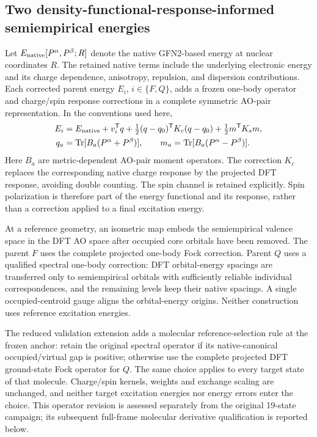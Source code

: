 \documentclass[11pt,a4paper]{article}
\begin{document}
\subsection{Two density-functional-response-informed semiempirical energies}
Let $E_{\rm native}[P^\alpha,P^\beta;R]$ denote the native GFN2-based energy at nuclear coordinates $R$. The retained native terms include the underlying electronic energy and its charge dependence, anisotropy, repulsion, and dispersion contributions. Each corrected parent energy $E_i$, $i\in\{F,Q\}$, adds a frozen one-body operator and charge/spin response corrections in a complete symmetric AO-pair representation. In the conventions used here,
\begin{align}
 E_i &= E_{\rm native}+v_i^{\mathsf T}q
 +\tfrac12(q-q_0)^{\mathsf T}K_c(q-q_0)
 +\tfrac12m^{\mathsf T}K_s m,\label{eq:parent}\\
 q_a&=\operatorname{Tr}[B_a(P^\alpha+P^\beta)],\qquad
 m_a=\operatorname{Tr}[B_a(P^\alpha-P^\beta)].
\end{align}
Here $B_a$ are metric-dependent AO-pair moment operators. The correction $K_c$ replaces the corresponding native charge response by the projected DFT response, avoiding double counting. The spin channel is retained explicitly. Spin polarization is therefore part of the energy functional and its response, rather than a correction applied to a final excitation energy.

At a reference geometry, an isometric map embeds the semiempirical valence space in the DFT AO space after occupied core orbitals have been removed. The parent $F$ uses the complete projected one-body Fock correction. Parent $Q$ uses a qualified spectral one-body correction: DFT orbital-energy spacings are transferred only to semiempirical orbitals with sufficiently reliable individual correspondences, and the remaining levels keep their native spacings. A single occupied-centroid gauge aligns the orbital-energy origins. Neither construction uses reference excitation energies.

The reduced validation extension adds a molecular reference-selection rule at the frozen anchor: retain the original spectral operator if its native-canonical occupied/virtual gap is positive; otherwise use the complete projected DFT ground-state Fock operator for $Q$. The same choice applies to every target state of that molecule. Charge/spin kernels, weights and exchange scaling are unchanged, and neither target excitation energies nor energy errors enter the choice. This operator revision is assessed separately from the original 19-state campaign; its subsequent full-frame molecular derivative qualification is reported below.
\end{document}
